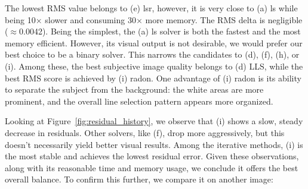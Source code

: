 The lowest RMS value belongs to (e) lsr, however, it is very close to (a) ls while being 10× slower and consuming 30× more memory. The RMS delta is negligible (\(\approx\)0.0042). Being the simplest, the (a) ls solver is both the fastest and the most memory efficient. However, its visual output is not desirable, we would prefer our best choice to be a binary solver. This narrows the candidates to (d), (f), (h), or (i). Among these, the best subjective image quality belongs to (d) LLS, while the best RMS score is achieved by (i) radon. One advantage of (i) radon is its ability to separate the subject from the background: the white areas are more prominent, and the overall line selection pattern appears more organized.

Looking at Figure~\ref{fig:residual_history}, we observe that (i) shows a slow, steady decrease in residuals. Other solvers, like (f), drop more aggressively, but this doesn’t necessarily yield better visual results. Among the iterative methods, (i) is the most stable and achieves the lowest residual error. Given these observations, along with its reasonable time and memory usage, we conclude it offers the best overall balance. To confirm this further, we compare it on another image:

